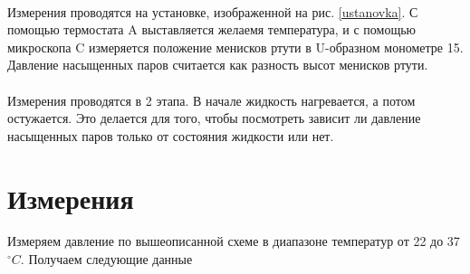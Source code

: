 \documentclass[a4paper, 12pt]{article}
\begin{document}
    \paragraph{}
    Измерения проводятся на установке, изображенной на рис. \ref{ustanovka}. С помощью термостата A выставляется желаемя температура, и с помощью микроскопа C измеряется положение менисков ртути в U-образном монометре 15. Давление насыщенных паров считается как разность высот менисков ртути.
    \paragraph{}
    Измерения проводятся в 2 этапа. В начале жидкость нагревается, а потом остужается. Это делается для того, чтобы посмотреть зависит ли давление насыщенных паров только от состояния жидкости или нет.

    \section{Измерения}
    Измеряем давление по вышеописанной схеме в диапазоне температур от 22 до 37 $^\circ C$. Получаем следующие данные
\end{document}

